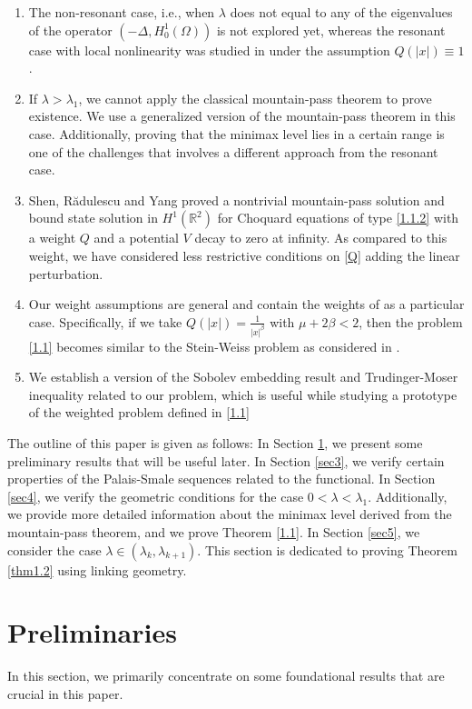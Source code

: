 \documentclass[11pt]{amsart}
\numberwithin{equation}{section}
\newcommand{\R}{\mathbb{R}}
\newcommand{\h}{H^1_0(\Omega)}
\newcommand{\1}{\frac{1}{2}}
\begin{document}
	\begin{enumerate}
		\item[(i)] The non-resonant case, i.e., when $\lambda$ does not equal to any of the eigenvalues of the operator $(-\Delta, \h)$ is not explored yet, whereas the resonant case with local nonlinearity was studied in \cite{Bruno} under the assumption $Q(|x|)\equiv1$. 
		\item[(ii)] If $\lambda>\lambda_1$, we cannot apply the classical mountain-pass theorem to prove existence. We use a generalized version of the mountain-pass theorem in this case. Additionally, proving that the minimax level lies in a certain range is one of the challenges that involves a different approach from the resonant case.
		\item[(iii)] Shen, R\u adulescu and Yang \cite{Shen} proved a nontrivial mountain-pass solution and bound state solution in $H^1(\R^2)$ for Choquard equations of type \eqref{1.1.2} with a weight $Q$ and a potential $V$ decay to zero at infinity. As compared to this weight, we have considered less restrictive conditions on \eqref{Q} adding the linear perturbation.
		\item[(iv)] {Our weight assumptions are general and contain the weights of \cite{Alves1, Shen} as a particular case. Specifically, if we take $Q(|x|)= \frac{1}{|x|^\beta}$ with $\mu+2\beta<2$, then the problem \eqref{1.1} becomes similar to the Stein-Weiss problem as considered in \cite{Alves1, Shen}}.
		\item[(v)] We establish a version of the Sobolev embedding result and Trudinger-Moser inequality related to our problem, which is useful while studying a prototype of the weighted problem defined in \eqref{1.1} 
	\end{enumerate}
	
	The outline of this paper is given as follows:
	In Section \ref{sec2}, we present some preliminary results that will be useful later. In Section \ref{sec3}, we verify certain properties of the Palais-Smale sequences related to the functional. In Section \ref{sec4}, we verify the geometric conditions for the case $0<\lambda<\lambda_1$. Additionally, we provide more detailed information about the minimax level derived from the mountain-pass theorem, and we prove Theorem \ref{1.1}. In Section \ref{sec5}, we consider the case $\lambda \in (\lambda_k, \lambda_{k+1})$.  This section is dedicated to proving Theorem \ref{thm1.2} using linking geometry. 
	\section{Preliminaries}
	\label{sec2}
	In this section, we primarily concentrate on some foundational results that are crucial in this paper.
\end{document}
